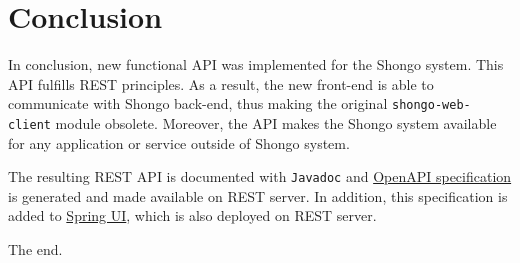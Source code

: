 \chapter{Conclusion}
In conclusion, new functional API was implemented for the Shongo system.
This API fulfills REST principles.
As a result, the new front-end \cite{drobnakm} is able to communicate with Shongo back-end, thus making the original \texttt{shongo-web-client} module obsolete.
Moreover, the API makes the Shongo system available for any application or service outside of Shongo system.

The resulting REST API is documented with \texttt{Javadoc} and \hyperref[sec:openapi]{OpenAPI specification} is generated and made available on REST server.
In addition, this specification is added to \hyperref[sec:spring]{Spring UI}, which is also deployed on REST server.

The end.
